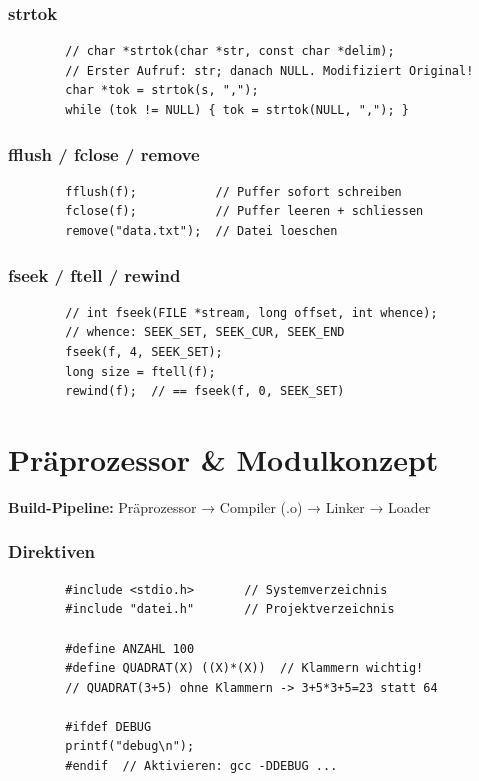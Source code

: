 \documentclass[a4paper,9pt]{article}
\begin{document}
	\subsubsection{strtok}
	\begin{lstlisting}
		// char *strtok(char *str, const char *delim);
		// Erster Aufruf: str; danach NULL. Modifiziert Original!
		char *tok = strtok(s, ",");
		while (tok != NULL) { tok = strtok(NULL, ","); }
	\end{lstlisting}
	
	\subsubsection{fflush / fclose / remove}
	\begin{lstlisting}
		fflush(f);           // Puffer sofort schreiben
		fclose(f);           // Puffer leeren + schliessen
		remove("data.txt");  // Datei loeschen
	\end{lstlisting}
	
	\subsubsection{fseek / ftell / rewind}
	\begin{lstlisting}
		// int fseek(FILE *stream, long offset, int whence);
		// whence: SEEK_SET, SEEK_CUR, SEEK_END
		fseek(f, 4, SEEK_SET);
		long size = ftell(f);
		rewind(f);  // == fseek(f, 0, SEEK_SET)
	\end{lstlisting}
	
	\section{Präprozessor \& Modulkonzept}
	
	\textbf{Build-Pipeline:} Präprozessor → Compiler (.o) → Linker → Loader
	
	\subsubsection{Direktiven}
	\begin{lstlisting}
		#include <stdio.h>       // Systemverzeichnis
		#include "datei.h"       // Projektverzeichnis
		
		#define ANZAHL 100
		#define QUADRAT(X) ((X)*(X))  // Klammern wichtig!
		// QUADRAT(3+5) ohne Klammern -> 3+5*3+5=23 statt 64
		
		#ifdef DEBUG
		printf("debug\n");
		#endif  // Aktivieren: gcc -DDEBUG ...
	\end{lstlisting}
	
\end{document}
